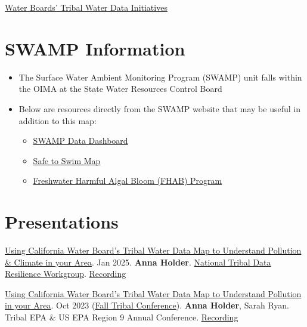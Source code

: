 \documentclass[
  letterpaper,
  DIV=11,
  numbers=noendperiod]{scrreprt}
\begin{document}
\href{https://www.waterboards.ca.gov/resources/oima/tribal_water_data_initiatives/}{Water
Boards' Tribal Water Data Initiatives}

\section{SWAMP Information}\label{swamp-information}

\begin{itemize}
\item
  The Surface Water Ambient Monitoring Program (SWAMP) unit falls within
  the OIMA at the State Water Resources Control Board
\item
  Below are resources directly from the SWAMP website that may be useful
  in addition to this map:

  \begin{itemize}
  \item
    \href{https://gispublic.waterboards.ca.gov/swamp-data/}{SWAMP Data
    Dashboard}
  \item
    \href{https://mywaterquality.ca.gov/safe-to-swim/content/interactive_map/index.html}{Safe
    to Swim Map}
  \item
    \href{https://www.waterboards.ca.gov/water_issues/programs/swamp/freshwater_cyanobacteria.html}{Freshwater
    Harmful Algal Bloom (FHAB) Program}
  \end{itemize}
\end{itemize}

\section{Presentations}\label{presentations}

\href{https://drive.google.com/file/d/1fJSZywbhhlgFK6H-LSwDVOmc_iJZEErZ/view?usp=sharing}{Using
California Water Board's Tribal Water Data Map to Understand Pollution
\& Climate in your Area}. Jan 2025. \textbf{Anna Holder}.
\href{https://tribalclimatehealth.org/tools-resources/data-development/}{National
Tribal Data Resilience Workgroup}.
\href{https://youtu.be/im4xqnCkJ90?si=j6hubFR5mtjhcI7y&t=793}{Recording}

\href{https://drive.google.com/file/d/11xj_Bj4m9MeaVkGYySrKZOR-KEZCJh9x/view?usp=sharing}{Using
California Water Board's Tribal Water Data Map to Understand Pollution
in your Area}. Oct 2023
(\href{https://tribalepa.com/2023-conference/}{Fall Tribal Conference}).
\textbf{Anna Holder}, Sarah Ryan. Tribal EPA \& US EPA Region 9 Annual
Conference.
\href{https://youtu.be/5s0AfEzw2_s?si=HAj_03DC3PDUnfHp&t=185}{Recording}
\end{document}
